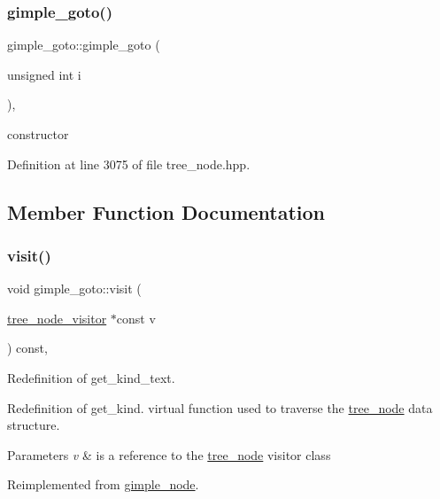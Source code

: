 \subsubsection{\texorpdfstring{gimple\+\_\+goto()}{gimple\_goto()}}
{\footnotesize\ttfamily gimple\+\_\+goto\+::gimple\+\_\+goto (\begin{DoxyParamCaption}\item[{unsigned int}]{i }\end{DoxyParamCaption})\hspace{0.3cm}{\ttfamily [inline]}, {\ttfamily [explicit]}}



constructor 



Definition at line 3075 of file tree\+\_\+node.\+hpp.



\subsection{Member Function Documentation}
\mbox{\label{structgimple__goto_a201fad3cf9302bdcd1c462b9d581d298}} 
\subsubsection{\texorpdfstring{visit()}{visit()}}
{\footnotesize\ttfamily void gimple\+\_\+goto\+::visit (\begin{DoxyParamCaption}\item[{\hyperlink{classtree__node__visitor}{tree\+\_\+node\+\_\+visitor} $\ast$const}]{v }\end{DoxyParamCaption}) const\hspace{0.3cm}{\ttfamily [override]}, {\ttfamily [virtual]}}



Redefinition of get\+\_\+kind\+\_\+text. 

Redefinition of get\+\_\+kind. virtual function used to traverse the \hyperlink{classtree__node}{tree\+\_\+node} data structure. 
\begin{DoxyParams}{Parameters}
{\em v} & is a reference to the \hyperlink{classtree__node}{tree\+\_\+node} visitor class \\
\hline
\end{DoxyParams}


Reimplemented from \hyperlink{structgimple__node_a337b029a3aca9c1b96311b6e6668f7f3}{gimple\+\_\+node}.



